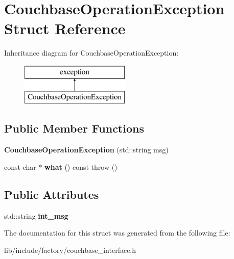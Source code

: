 \hypertarget{structCouchbaseOperationException}{\section{Couchbase\-Operation\-Exception Struct Reference}
\label{structCouchbaseOperationException}
}
Inheritance diagram for Couchbase\-Operation\-Exception\-:\begin{figure}[H]
\begin{center}
\leavevmode
\includegraphics[height=2.000000cm]{structCouchbaseOperationException}
\end{center}
\end{figure}
\subsection*{Public Member Functions}
\begin{DoxyCompactItemize}
\item 
\hypertarget{structCouchbaseOperationException_ae8a8b41b0ad45aa6fde99e3607a6953b}{{\bfseries Couchbase\-Operation\-Exception} (std\-::string msg)}\label{structCouchbaseOperationException_ae8a8b41b0ad45aa6fde99e3607a6953b}

\item 
\hypertarget{structCouchbaseOperationException_af7f48b5ad89affc447e896b2e3c76a36}{const char $\ast$ {\bfseries what} () const   throw ()}\label{structCouchbaseOperationException_af7f48b5ad89affc447e896b2e3c76a36}

\end{DoxyCompactItemize}
\subsection*{Public Attributes}
\begin{DoxyCompactItemize}
\item 
\hypertarget{structCouchbaseOperationException_add2d35913e6d8a991522a6a12fd224d2}{std\-::string {\bfseries int\-\_\-msg}}\label{structCouchbaseOperationException_add2d35913e6d8a991522a6a12fd224d2}

\end{DoxyCompactItemize}


The documentation for this struct was generated from the following file\-:\begin{DoxyCompactItemize}
\item 
lib/include/factory/couchbase\-\_\-interface.\-h\end{DoxyCompactItemize}
